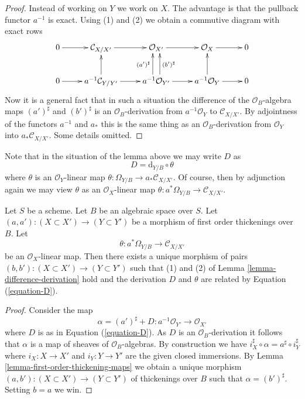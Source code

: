 \begin{proof}
Instead of working on $Y$ we work on $X$. The advantage is that the pullback
functor $a^{-1}$ is exact. Using (1) and (2) we obtain a commutive diagram
with exact rows
$$
\xymatrix{
0 \ar[r] &
\mathcal{C}_{X/X'} \ar[r] &
\mathcal{O}_{X'} \ar[r] &
\mathcal{O}_X \ar[r] & 0 \\
0 \ar[r] &
a^{-1}\mathcal{C}_{Y/Y'} \ar[r] \ar[u] &
a^{-1}\mathcal{O}_{Y'}
\ar[r] \ar@<1ex>[u]^{(a')^\sharp} \ar@<-1ex>[u]_{(b')^\sharp} &
a^{-1}\mathcal{O}_Y \ar[r] \ar[u] & 0
}
$$
Now it is a general fact that in such a situation the difference of the
$\mathcal{O}_B$-algebra maps $(a')^\sharp$ and $(b')^\sharp$ is an
$\mathcal{O}_B$-derivation from $a^{-1}\mathcal{O}_Y$ to $\mathcal{C}_{X/X'}$.
By adjointness of the functors $a^{-1}$ and $a_*$ this is the same
thing as an $\mathcal{O}_B$-derivation from
$\mathcal{O}_Y$ into $a_*\mathcal{C}_{X/X'}$. Some details omitted.
\end{proof}

\noindent
Note that in the situation of the lemma above we may write
$D$ as
\begin{equation}
\label{equation-D}
D = \text{d}_{Y/B} \circ \theta
\end{equation}
where $\theta$ is an $\mathcal{O}_Y$-linear map
$\theta : \Omega_{Y/B} \to a_*\mathcal{C}_{X/X'}$.
Of course, then by adjunction again we may view $\theta$ as an
$\mathcal{O}_X$-linear map
$\theta : a^*\Omega_{Y/B} \to \mathcal{C}_{X/X'}$.

\begin{lemma}
\label{lemma-action-by-derivations}
Let $S$ be a scheme. Let $B$ be an algebraic space over $S$.
Let $(a, a') : (X \subset X') \to (Y \subset Y')$
be a morphism of first order thickenings over $B$.
Let
$$
\theta : a^*\Omega_{Y/B} \to \mathcal{C}_{X/X'}
$$
be an $\mathcal{O}_X$-linear map. Then there exists a unique morphism of pairs
$(b, b') : (X \subset X') \to (Y \subset Y')$ such that
(1) and (2) of
Lemma \ref{lemma-difference-derivation}
hold and the derivation $D$ and $\theta$ are related by
Equation (\ref{equation-D}).
\end{lemma}

\begin{proof}
Consider the map
$$
\alpha = (a')^\sharp + D : a^{-1}\mathcal{O}_{Y'} \to \mathcal{O}_{X'}
$$
where $D$ is as in Equation (\ref{equation-D}). As $D$ is an
$\mathcal{O}_B$-derivation it follows that $\alpha$ is a map of
sheaves of $\mathcal{O}_B$-algebras. By construction we have
$i_X^\sharp \circ \alpha = a^\sharp \circ i_Y^\sharp$ where
$i_X : X \to X'$ and $i_Y : Y \to Y'$ are the given closed immersions. By
Lemma \ref{lemma-first-order-thickening-maps}
we obtain a unique morphism
$(a, b') : (X  \subset X') \to (Y \subset Y')$ of thickenings
over $B$ such that $\alpha = (b')^\sharp$. Setting $b = a$
we win.
\end{proof}

